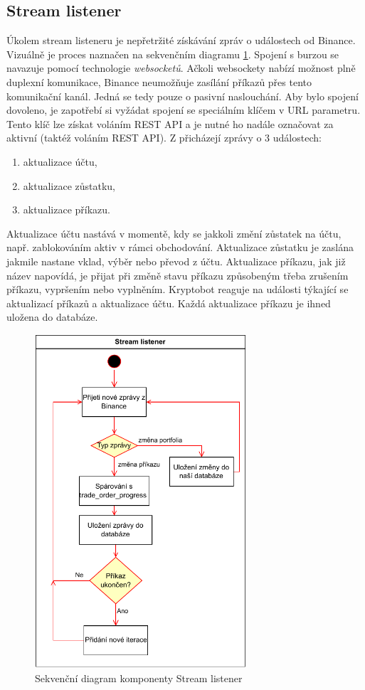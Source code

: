 \subsection{Stream listener}
Úkolem stream listeneru je nepřetržité získávání zpráv o událostech od Binance. Vizuálně je proces naznačen na sekvenčním diagramu \ref{figure:listener}.
Spojení s burzou se navazuje pomocí technologie \emph{websocketů}. Ačkoli websockety nabízí možnost plně duplexní komunikace, Binance
neumožňuje zasílání příkazů přes tento komunikační kanál. Jedná se tedy pouze o pasivní naslouchání. Aby bylo spojení dovoleno, je zapotřebí si vyžádat spojení se speciálním klíčem v URL parametru.
Tento klíč lze získat voláním REST API a je nutné ho nadále označovat za aktivní (taktéž voláním REST API). Z přicházejí zprávy o 3 událostech:
\begin{enumerate}
    \item aktualizace účtu,
    \item aktualizace zůstatku,
    \item aktualizace příkazu.
\end{enumerate}
Aktualizace účtu nastává v momentě, kdy se jakkoli změní zůstatek na účtu, např. zablokováním aktiv v rámci obchodování. Aktualizace zůstatku je zaslána jakmile nastane vklad, výběr nebo převod z účtu.
Aktualizace příkazu, jak již název napovídá, je přijat při změně stavu příkazu způsobeným třeba zrušením příkazu, vypršením nebo vyplněním. Kryptobot reaguje na události týkající se aktualizací příkazů
a aktualizace účtu. Každá aktualizace příkazu je ihned uložena do databáze.

\begin{figure}
    \centering
    \includegraphics[width=0.7\textwidth]{Figures/listener.pdf}
    \caption{Sekvenční diagram komponenty Stream listener}
    \label{figure:listener}
\end{figure}

